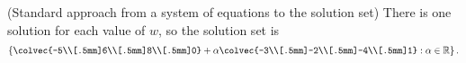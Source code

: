 \begin{example}{(Standard approach  from a system of equations to the solution set)}
There is one solution for each value of $w$, so the solution set is 
\[
\left\{    \colvec{-5\\[.5mm]6\\[.5mm]8\\[.5mm]0} 
+ 
\alpha \colvec{-3\\[.5mm]-2\\[.5mm]-4\\[.5mm]1} : \alpha \in \mathbb{R} \right\}.
\]
\end{example}
